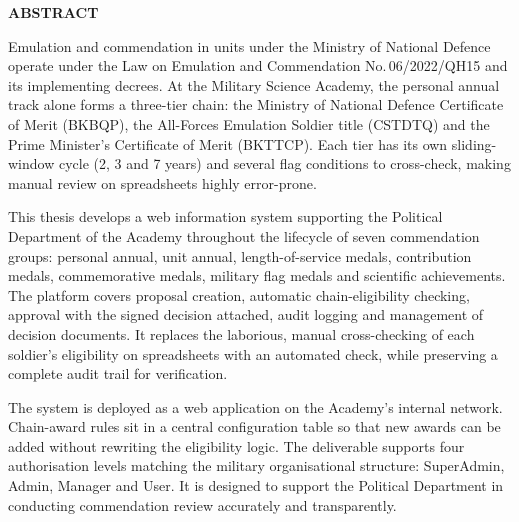 \documentclass[../DoAn.tex]{subfiles}
\begin{document}
\begin{center}
    \Large{\textbf{ABSTRACT}}\\
\end{center}
\vspace{1cm}

Emulation and commendation in units under the Ministry of National Defence operate under the Law on Emulation and Commendation No.\,06/2022/QH15 and its implementing decrees.
At the Military Science Academy, the personal annual track alone forms a three-tier chain: the Ministry of National Defence Certificate of Merit (BKBQP), the All-Forces Emulation Soldier title (CSTDTQ) and the Prime Minister's Certificate of Merit (BKTTCP).
Each tier has its own sliding-window cycle (2, 3 and 7 years) and several flag conditions to cross-check, making manual review on spreadsheets highly error-prone.

This thesis develops a web information system supporting the Political Department of the Academy throughout the lifecycle of seven commendation groups: personal annual, unit annual, length-of-service medals, contribution medals, commemorative medals, military flag medals and scientific achievements.
The platform covers proposal creation, automatic chain-eligibility checking, approval with the signed decision attached, audit logging and management of decision documents.
It replaces the laborious, manual cross-checking of each soldier's eligibility on spreadsheets with an automated check, while preserving a complete audit trail for verification.

The system is deployed as a web application on the Academy's internal network.
Chain-award rules sit in a central configuration table so that new awards can be added without rewriting the eligibility logic.
The deliverable supports four authorisation levels matching the military organisational structure: SuperAdmin, Admin, Manager and User.
It is designed to support the Political Department in conducting commendation review accurately and transparently.
\end{document}
